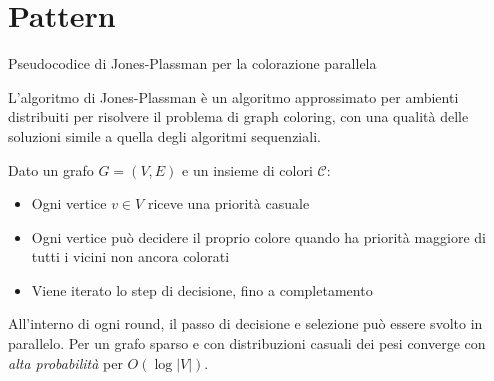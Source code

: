 \section{Pattern}

\begin{questions}
    \question Pseudocodice di Jones-Plassman per la colorazione parallela
    
    \begin{solution}
        L'algoritmo di Jones-Plassman è un algoritmo approssimato per ambienti distribuiti per risolvere il problema di graph coloring, con una qualità delle soluzioni simile a quella degli algoritmi sequenziali.
        
        Dato un grafo $G = (V, E)$ e un insieme di colori $\mathcal{C}$: 
        \begin{itemize}
            \item Ogni vertice $v \in V$ riceve una priorità casuale
            
            \item Ogni vertice può decidere il proprio colore quando ha priorità maggiore di tutti i vicini non ancora colorati
            
            \item Viene iterato lo step di decisione, fino a completamento
        \end{itemize}
        
        All'interno di ogni round, il passo di decisione e selezione può essere svolto in parallelo. Per un grafo sparso e con distribuzioni casuali dei pesi converge con \textit{alta probabilità} per $O(\log |V|)$.
        

\end{solution}
\end{questions}
